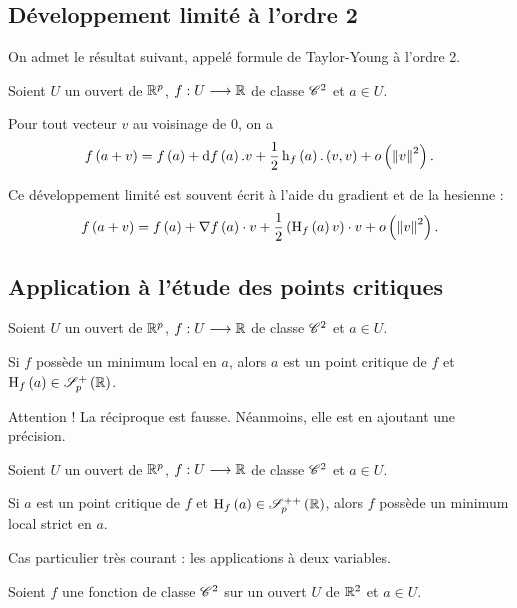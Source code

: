 \subsection{Développement limité à l'ordre 2}

On admet le résultat suivant, appelé formule de Taylor-Young à l'ordre 2.

\begin{prop}
Soient \(U\) un ouvert de \(\mathbb{R}^p\), \(f:U\longrightarrow\mathbb{R}\) de classe \(\mathscr{C}^{2}\) et \(a\in U\).

Pour tout vecteur \(v\) au voisinage de \(0\), on a \[f\paren{a+v}=f\paren{a}+\odif{f}\paren{a}.v+\dfrac{1}{2}\formehessienne{f}\paren{a}.\paren{v,v}+\o{\norme{v}^2}.\]
\end{prop}

Ce développement limité est souvent écrit à l'aide du gradient et de la hesienne : \[f\paren{a+v}=f\paren{a}+\nabla f\paren{a}\scal v+\dfrac{1}{2}\paren{\hessienne{f}\paren{a}v}\scal v+\o{\norme{v}^2}.\]

\subsection{Application à l'étude des points critiques}

\begin{prop}
Soient \(U\) un ouvert de \(\mathbb{R}^p\), \(f:U\longrightarrow\mathbb{R}\) de classe \(\mathscr{C}^{2}\) et \(a\in U\).

Si \(f\) possède un minimum local en \(a\), alors \(a\) est un point critique de \(f\) et \(\hessienne{f}\paren{a}\in\sympos{p}[\R]\).
\end{prop}

\begin{rem}
Attention ! La réciproque est fausse. Néanmoins, elle est  en ajoutant une précision.
\end{rem}

\begin{prop}
Soient \(U\) un ouvert de \(\mathbb{R}^p\), \(f:U\longrightarrow\mathbb{R}\) de classe \(\mathscr{C}^{2}\) et \(a\in U\).

Si \(a\) est un point critique de \(f\) et \(\hessienne{f}\paren{a}\in\symdefpos{p}[\R]\), alors \(f\) possède un minimum local strict en \(a\).
\end{prop}

Cas particulier très courant : les applications à deux variables.

Soient \(f\) une fonction de classe \(\mathscr{C}^{2}\) sur un ouvert \(U\) de \(\mathbb{R}^2\) et \(a\in U\).

